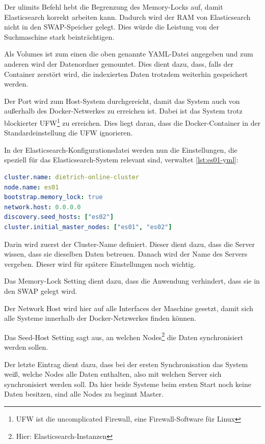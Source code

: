 Der ulimits Befehl hebt die Begrenzung des Memory-Locks auf, damit Elasticsearch korrekt arbeiten kann. Dadurch wird der RAM von Elasticsearch nicht in den SWAP-Speicher gelegt. Dies würde die Leistung von der Suchmaschine stark beinträchtigen.

Als Volumes ist zum einen die oben genannte YAML-Datei angegeben und zum anderen wird der Datenordner gemountet. Dies dient dazu, dass, falls der Container zerstört wird, die indexierten Daten trotzdem weiterhin gespeichert werden.

Der Port wird zum Host-System durchgereicht, damit das System auch von außerhalb des Docker-Netwerkes zu erreichen ist. Dabei ist das System trotz blockierter UFW\footnote{UFW ist die uncomplicated Firewall, eine Firewall-Software für Linux} zu erreichen. Dies liegt daran, dass die Docker-Container in der Standardeinstellung die UFW ignorieren.

In der Elasticsearch-Konfigurationsdatei werden nun die Einstellungen, die speziell für das Elasticsearch-System relevant sind, verwaltet \ref{lst:es01-yml}: 

\begin{lstlisting}[language=YAML, frame=single, label={lst:es01-yml}, caption=Auschnitt aus der Konfigurationsdatei von Elasticsearch,captionpos=b] 
cluster.name: dietrich-online-cluster
node.name: es01
bootstrap.memory_lock: true
network.host: 0.0.0.0
discovery.seed_hosts: ["es02"]
cluster.initial_master_nodes: ["es01", "es02"]
\end{lstlisting}

Darin wird zuerst der Cluster-Name definiert. Dieser dient dazu, dass die Server wissen, dass sie dieselben Daten betreuen. 
Danach wird der Name des Servers vergeben. Dieser wird für spätere Einstellungen noch wichtig.

Das Memory-Lock Setting dient dazu, dass die Anwendung verhindert, dass sie in den SWAP gelegt wird.

Der Network Host wird hier auf alle Interfaces der Maschine gesetzt, damit sich alle Systeme innerhalb der Docker-Netzwerkes finden können.

Das Seed-Host Setting sagt aus, an welchen Nodes\footnote{Hier: Elasticsearch-Instanzen} die Daten synchronisiert werden sollen.

Der letzte Eintrag dient dazu, dass bei der ersten Synchronisation das System weiß, welche Nodes alle Daten enthalten, also mit welchen Server sich synchronisiert werden soll. Da hier beide Systeme beim ersten Start noch keine Daten besitzen, sind alle Nodes zu beginnt Master. 


